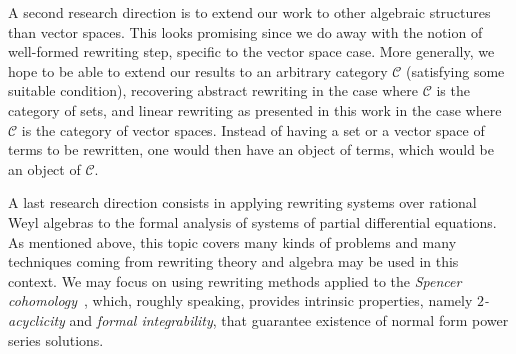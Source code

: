 \documentclass[11pt]{article}
\theoremstyle{definition}
\begin{document}
A second research direction is to extend our work to other algebraic
structures than vector spaces. This looks promising since we do away with
the notion of well-formed rewriting step, specific to the vector space
case. More generally, we hope to be able to extend our results to an
arbitrary category $\mathcal C$ (satisfying some suitable condition), 
recovering abstract rewriting in the case where $\mathcal C$ is the
category of sets, and linear rewriting as presented in this work in the
case where $\mathcal C$ is the category of vector spaces. Instead of
having a set or a vector space of terms to be rewritten, one would then
have an object of terms, which would be an object of $\mathcal C$. 
\medskip

A last research direction consists in applying rewriting systems over
rational Weyl algebras to the formal analysis of systems of partial
differential equations. As mentioned above, this topic covers many kinds
of problems and many techniques coming from rewriting theory and algebra
may be used in this context. We may focus on using rewriting methods
applied to the {\em Spencer cohomology}~\cite{MR1308976}, which, roughly
speaking, provides intrinsic properties, namely {\em $2$-acyclicity} and
{\em formal integrability}, that guarantee existence of normal form power
series solutions. 


\end{document}
